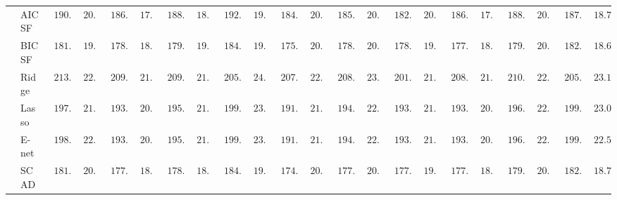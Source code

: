 \begin{tabular}{ll|ll|llllll|llllll|llllll}
 & AIC SF  & $\phantom{0}190.68$ & $\phantom{0}20.08$ & $\phantom{0}186.27$ & $\phantom{0}17.57$ & $\phantom{0}188.19$ & $\phantom{0}18.90$ & $\phantom{0}192.87$ & $\phantom{0}19.77$ & $\phantom{0}184.36$ & $\phantom{0}20.02$ & $\phantom{0}185.24$ & $\phantom{0}20.52$ & $\phantom{0}182.71$ & $\phantom{0}20.11$ & $\phantom{0}186.46$ & $\phantom{0}17.78$ & $\phantom{0}188.01$ & $\phantom{0}20.81$ & $\phantom{0}187.18$ & $\phantom{0}18.78$ \\
 & BIC SF  & $\phantom{0}181.93$ & $\phantom{0}19.98$ & $\phantom{0}178.03$ & $\phantom{0}18.19$ & $\phantom{0}179.56$ & $\phantom{0}19.30$ & $\phantom{0}184.62$ & $\phantom{0}19.12$ & $\phantom{0}175.60$ & $\phantom{0}20.12$ & $\phantom{0}178.02$ & $\phantom{0}20.72$ & $\phantom{0}178.02$ & $\phantom{0}19.72$ & $\phantom{0}177.96$ & $\phantom{0}18.17$ & $\phantom{0}179.54$ & $\phantom{0}20.65$ & $\phantom{0}182.36$ & $\phantom{0}18.61$ \\
 & Ridge  & $\phantom{0}213.07$ & $\phantom{0}22.18$ & $\phantom{0}209.45$ & $\phantom{0}21.25$ & $\phantom{0}209.58$ & $\phantom{0}21.46$ & $\phantom{0}205.13$ & $\phantom{0}24.08$ & $\phantom{0}207.25$ & $\phantom{0}22.26$ & $\phantom{0}208.19$ & $\phantom{0}23.89$ & $\phantom{0}201.54$ & $\phantom{0}21.18$ & $\phantom{0}208.38$ & $\phantom{0}21.07$ & $\phantom{0}210.38$ & $\phantom{0}22.20$ & $\phantom{0}205.66$ & $\phantom{0}23.11$ \\
 & Lasso  & $\phantom{0}197.97$ & $\phantom{0}21.81$ & $\phantom{0}193.68$ & $\phantom{0}20.48$ & $\phantom{0}195.44$ & $\phantom{0}21.44$ & $\phantom{0}199.87$ & $\phantom{0}23.85$ & $\phantom{0}191.33$ & $\phantom{0}21.59$ & $\phantom{0}194.22$ & $\phantom{0}22.64$ & $\phantom{0}193.17$ & $\phantom{0}21.26$ & $\phantom{0}193.83$ & $\phantom{0}20.93$ & $\phantom{0}196.42$ & $\phantom{0}22.21$ & $\phantom{0}199.16$ & $\phantom{0}23.05$ \\
 & E-net  & $\phantom{0}198.26$ & $\phantom{0}22.03$ & $\phantom{0}193.70$ & $\phantom{0}20.60$ & $\phantom{0}195.55$ & $\phantom{0}21.51$ & $\phantom{0}199.91$ & $\phantom{0}23.74$ & $\phantom{0}191.64$ & $\phantom{0}21.62$ & $\phantom{0}194.20$ & $\phantom{0}22.50$ & $\phantom{0}193.34$ & $\phantom{0}21.04$ & $\phantom{0}193.85$ & $\phantom{0}20.88$ & $\phantom{0}196.24$ & $\phantom{0}22.25$ & $\phantom{0}199.44$ & $\phantom{0}22.53$ \\
 & SCAD  & $\phantom{0}181.27$ & $\phantom{0}20.01$ & $\phantom{0}177.24$ & $\phantom{0}18.22$ & $\phantom{0}178.84$ & $\phantom{0}18.71$ & $\phantom{0}184.75$ & $\phantom{0}19.29$ & $\phantom{0}174.89$ & $\phantom{0}20.32$ & $\phantom{0}177.65$ & $\phantom{0}20.59$ & $\phantom{0}177.89$ & $\phantom{0}19.26$ & $\phantom{0}177.52$ & $\phantom{0}18.13$ & $\phantom{0}179.61$ & $\phantom{0}20.48$ & $\phantom{0}182.82$ & $\phantom{0}18.76$ \\

\end{tabular}
